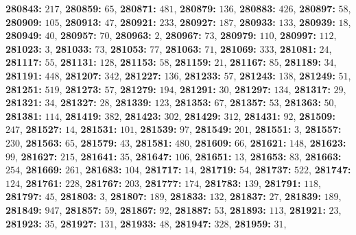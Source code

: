 \textsf{\bfseries 280843:} $217$, \textsf{\bfseries 280859:} $65$, \textsf{\bfseries 280871:} $481$, \textsf{\bfseries 280879:} $136$, \textsf{\bfseries 280883:} $426$, \textsf{\bfseries 280897:} $58$, \textsf{\bfseries 280909:} $105$, \textsf{\bfseries 280913:} $47$, \textsf{\bfseries 280921:} $233$, \textsf{\bfseries 280927:} $187$, \textsf{\bfseries 280933:} $133$, \textsf{\bfseries 280939:} $18$, \textsf{\bfseries 280949:} $40$, \textsf{\bfseries 280957:} $70$, \textsf{\bfseries 280963:} $2$, \textsf{\bfseries 280967:} $73$, \textsf{\bfseries 280979:} $110$, \textsf{\bfseries 280997:} $112$, \textsf{\bfseries 281023:} $3$, \textsf{\bfseries 281033:} $73$, \textsf{\bfseries 281053:} $77$, \textsf{\bfseries 281063:} $71$, \textsf{\bfseries 281069:} $333$, \textsf{\bfseries 281081:} $24$, \textsf{\bfseries 281117:} $55$, \textsf{\bfseries 281131:} $128$, \textsf{\bfseries 281153:} $58$, \textsf{\bfseries 281159:} $21$, \textsf{\bfseries 281167:} $85$, \textsf{\bfseries 281189:} $34$, \textsf{\bfseries 281191:} $448$, \textsf{\bfseries 281207:} $342$, \textsf{\bfseries 281227:} $136$, \textsf{\bfseries 281233:} $57$, \textsf{\bfseries 281243:} $138$, \textsf{\bfseries 281249:} $51$, \textsf{\bfseries 281251:} $519$, \textsf{\bfseries 281273:} $57$, \textsf{\bfseries 281279:} $194$, \textsf{\bfseries 281291:} $30$, \textsf{\bfseries 281297:} $134$, \textsf{\bfseries 281317:} $29$, \textsf{\bfseries 281321:} $34$, \textsf{\bfseries 281327:} $28$, \textsf{\bfseries 281339:} $123$, \textsf{\bfseries 281353:} $67$, \textsf{\bfseries 281357:} $53$, \textsf{\bfseries 281363:} $50$, \textsf{\bfseries 281381:} $114$, \textsf{\bfseries 281419:} $382$, \textsf{\bfseries 281423:} $302$, \textsf{\bfseries 281429:} $312$, \textsf{\bfseries 281431:} $92$, \textsf{\bfseries 281509:} $247$, \textsf{\bfseries 281527:} $14$, \textsf{\bfseries 281531:} $101$, \textsf{\bfseries 281539:} $97$, \textsf{\bfseries 281549:} $201$, \textsf{\bfseries 281551:} $3$, \textsf{\bfseries 281557:} $230$, \textsf{\bfseries 281563:} $65$, \textsf{\bfseries 281579:} $43$, \textsf{\bfseries 281581:} $480$, \textsf{\bfseries 281609:} $66$, \textsf{\bfseries 281621:} $148$, \textsf{\bfseries 281623:} $99$, \textsf{\bfseries 281627:} $215$, \textsf{\bfseries 281641:} $35$, \textsf{\bfseries 281647:} $106$, \textsf{\bfseries 281651:} $13$, \textsf{\bfseries 281653:} $83$, \textsf{\bfseries 281663:} $254$, \textsf{\bfseries 281669:} $261$, \textsf{\bfseries 281683:} $104$, \textsf{\bfseries 281717:} $14$, \textsf{\bfseries 281719:} $54$, \textsf{\bfseries 281737:} $522$, \textsf{\bfseries 281747:} $124$, \textsf{\bfseries 281761:} $228$, \textsf{\bfseries 281767:} $203$, \textsf{\bfseries 281777:} $174$, \textsf{\bfseries 281783:} $139$, \textsf{\bfseries 281791:} $118$, \textsf{\bfseries 281797:} $45$, \textsf{\bfseries 281803:} $3$, \textsf{\bfseries 281807:} $189$, \textsf{\bfseries 281833:} $132$, \textsf{\bfseries 281837:} $27$, \textsf{\bfseries 281839:} $189$, \textsf{\bfseries 281849:} $947$, \textsf{\bfseries 281857:} $59$, \textsf{\bfseries 281867:} $92$, \textsf{\bfseries 281887:} $53$, \textsf{\bfseries 281893:} $113$, \textsf{\bfseries 281921:} $23$, \textsf{\bfseries 281923:} $35$, \textsf{\bfseries 281927:} $131$, \textsf{\bfseries 281933:} $48$, \textsf{\bfseries 281947:} $328$, \textsf{\bfseries 281959:} $31$, 
